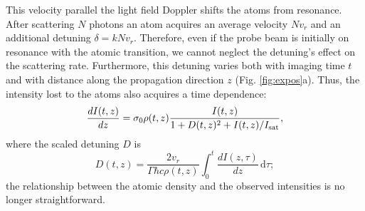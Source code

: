 \documentclass[12pt]{iopart}
\begin{document}
\par This velocity parallel the light field Doppler shifts the atoms from resonance. After scattering $N$ photons an atom acquires an average velocity $N v_r$ and an additional detuning $\delta=k N v_r$. Therefore, even if the probe beam is initially on resonance with the atomic transition, we cannot neglect the detuning's  effect on the scattering rate. Furthermore, this detuning varies both with imaging time $t$ and with distance along the propagation direction $z$ (Fig. \ref{fig:expos}a). Thus, the intensity lost to the atoms also acquires a time dependence: 
\begin{equation}
\frac{dI(t,z)}{dz}=\sigma_0 \rho(t,z) \frac{I(t,z)}{1+D(t,z)^2 +I(t,z)/I_{\rm{sat}}}, \label{eq3}
\end{equation}
where the scaled detuning $D$ is
\begin{equation}
D(t,z)=\frac{2 v_r}{\Gamma\hbar c \rho(t,z)}\int_0^t \frac{dI(z,\tau)}{dz}\,\mathrm{d}\tau; \label{eq4} 
\end{equation}
the relationship between the atomic density and the observed intensities is no longer straightforward.
\end{document}

